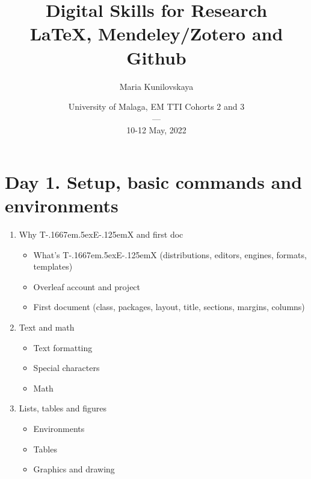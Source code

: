 \documentclass[a4paper,12pt]{article} %
\title{\vspace{-4em} Digital Skills for Research \\ \LaTeX, Mendeley/Zotero and Github}
\author{Maria Kunilovskaya}
\date{%
	University of Malaga, EM TTI Cohorts 2 and 3\\%
	---\\%
	10-12 May, 2022}
\def\TeX{{\rm T\kern-.1667em\lower.5ex\hbox{E}\kern-.125emX }}
\begin{document}
	
\clearpage\maketitle
\thispagestyle{empty}	
\maketitle

\vspace{-2em}

\section*{Day 1. Setup, basic commands and environments}
\begin{enumerate}
	\item Why \TeX and first doc 
		\begin{itemize}
			\item What's \TeX (distributions, editors, engines, formats, templates)
			\item Overleaf account and project
			\item First document (class, packages, layout, title, sections, margins, columns)
	\end{itemize} 
	\item Text and math
		\begin{itemize}
			\item Text formatting
			\item Special characters
			\item Math
		\end{itemize}
	\item Lists, tables and figures
		\begin{itemize}
			\item Environments
			\item Tables
			\item Graphics and drawing
		\end{itemize}
\end{enumerate}
\end{document}
